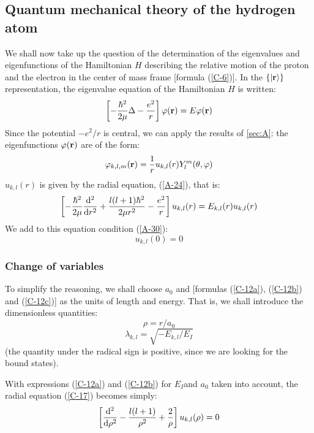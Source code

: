 \subsection{Quantum mechanical theory of the hydrogen atom}\label{sec:C-3}
We shall now take up the question of the determination of the eigenvalues and eigenfunctions of the Hamiltonian $H$ describing the relative motion of the proton and
the electron in the center of mass frame [formula (\ref{C-6})]. In the $\{\ket{\vb{r}}\}$ representation, the eigenvalue equation of the Hamiltonian $H$ is written:
\begin{equation}\label{C-15}
	\left[-\frac{\hbar^2}{2\mu}\Delta -\frac{e^2}{r}\right]\varphi(\vb{r})=E\varphi(\vb{r})
\end{equation}
Since the potential $-e^2/r$ is central, we can apply the results of \ref{sec:A}: the eigenfunctions $\varphi(\vb{r})$ are of the form:
\begin{equation}\label{C-16}
	\varphi_{k,l,m}(\vb{r})=\frac{1}{r}u_{k,l}(r)Y_l^m(\theta,\varphi)
\end{equation}
$u_{k,l}(r)$ is given by the radial equation, (\ref{A-24}), that is:
\begin{equation}\label{C-17}
	\left[-\frac{\hbar^2}{2\mu}\dv[2]{r}+\frac{l(l+1)\hbar^2}{2\mu r^2}-\frac{e^2}{r}\right]u_{k,l}(r)=E_{k,l}(r)u_{k,l}(r)
\end{equation}
We add to this equation condition (\ref{A-30}):
\begin{equation}\label{C-18}
	u_{k,l}(0)=0
\end{equation}

\subsubsection{Change of variables}
To simplify the reasoning, we shall choose $a_0$ and [formulas (\ref{C-12a}), (\ref{C-12b}) and (\ref{C-12c})] as the units of length and energy. That is, we shall introduce the dimensionless quantities:
\begin{equation}\label{A-19}
	\rho = r/a_0
\end{equation}
\begin{equation}\label{C-20}
	\lambda_{k,l}=\sqrt{-E_{k,l}/E_I}
\end{equation}
(the quantity under the radical sign is positive, since we are looking for the bound states).

With expressions (\ref{C-12a}) and (\ref{C-12b}) for $E_I $and $a_0$ taken into account, the radial equation (\ref{C-17}) becomes simply:
\begin{equation}\label{C-21}
	\left[\dv[2]{\rho}-\frac{l(l+1)}{\rho^2}+\frac{2}{\rho}\right]u_{k,l}(\rho)=0
\end{equation}

